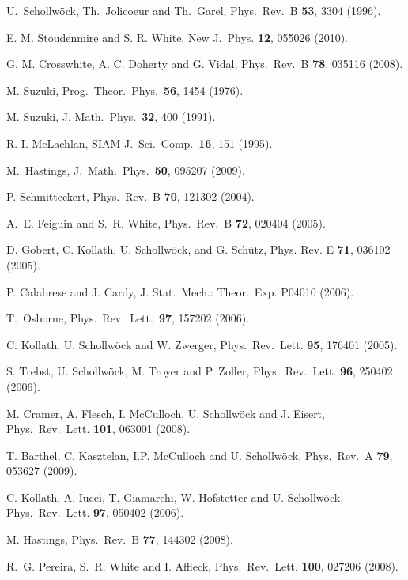 U.~Schollw\"{o}ck, Th.~Jolicoeur and Th.~Garel, Phys.\ Rev.\ B {\bf 53}, 3304 (1996).

E. M. Stoudenmire and S. R. White, New J.\ Phys. {\bf 12}, 055026 (2010).

G. M. Crosswhite, A. C. Doherty and G. Vidal, Phys.\ Rev.\ B {\bf 78}, 035116 (2008).

 M. Suzuki, Prog.\ Theor.\ Phys.\ {\bf 56}, 1454 (1976).

 M. Suzuki, J. Math.\ Phys.\ {\bf 32}, 400 (1991).

 R. I. McLachlan, SIAM J.\ Sci.\ Comp.\ {\bf 16}, 151 (1995).

 M.~Hastings, J.\ Math.\ Phys.\ {\bf 50}, 095207 (2009).

P. Schmitteckert, Phys.\ Rev.\ B {\bf 70}, 121302 (2004).

A.~E. Feiguin and S.~R. White, Phys.\ Rev.\ B {\bf 72}, 020404 (2005).

D. Gobert, C. Kollath, U. Schollw{\"o}ck, and G. Sch{\"u}tz, Phys. Rev. E {\bf
  71},  036102  (2005).

P. Calabrese and J. Cardy, J. Stat.\ Mech.: Theor.\ Exp. P04010 (2006).

T.~Osborne, Phys.\ Rev.\ Lett.\ {\bf 97}, 157202 (2006).

C. Kollath, U. Schollw\"{o}ck and W. Zwerger, Phys.\ Rev.\ Lett. {\bf 95}, 176401 (2005).

S. Trebst, U. Schollw\"{o}ck, M. Troyer and P. Zoller, Phys.\ Rev.\ Lett. {\bf 96}, 250402 (2006).

M. Cramer, A. Flesch, I. McCulloch, U. Schollw\"{o}ck and J. Eisert, Phys.\ Rev.\ Lett. {\bf 101}, 063001 (2008).

T. Barthel, C. Kasztelan, I.P. McCulloch and U. Schollw\"{o}ck, Phys.\ Rev.\ A {\bf 79}, 053627 (2009).

C. Kollath, A. Iucci, T. Giamarchi, W. Hofstetter and U. Schollw\"{o}ck, Phys.\ Rev.\ Lett. {\bf 97}, 050402 (2006).

M. Hastings, Phys.\ Rev.\ B {\bf 77}, 144302 (2008).

R.~G. Pereira, S.~R. White and I. Affleck,
Phys.\ Rev.\ Lett. {\bf 100}, 027206 (2008).

